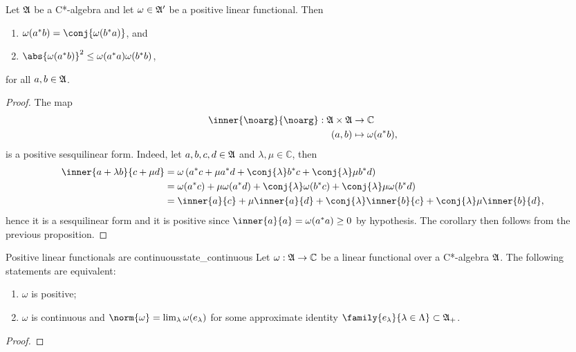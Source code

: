 \begin{corollary}
    Let \(\mathfrak{A}\) be a C*-algebra and let \(\omega \in \mathfrak{A}'\) be a positive linear functional. Then
    \begin{enumerate}[label=(\alph*)]
        \item \(\omega(a^*b) = \conj{\omega(b^*a)}\), and
        \item \(\abs{\omega(a^*b)}^2 \leq \omega(a^*a) \omega(b^*b)\),
    \end{enumerate}
    for all \(a, b \in \mathfrak{A}\).
\end{corollary}
\begin{proof}
    The map
    \begin{align*}
        \inner{\noarg}{\noarg} : \algebra{A} \times \algebra{A} &\to \mathbb{C}\\
                                                          (a,b) &\mapsto \omega(a^*b),
    \end{align*}
    is a positive sesquilinear form. Indeed, let \(a, b,c,d \in \mathfrak{A}\) and \(\lambda,\mu \in \mathbb{C}\), then
    \begin{align*}
        \inner{a + \lambda b}{c + \mu d} &= \omega\left(a^*c + \mu a^*d + \conj{\lambda} b^* c + \conj{\lambda}\mu b^*d\right)\\
                                         &= \omega(a^*c) + \mu \omega(a^*d) + \conj{\lambda} \omega(b^*c) + \conj{\lambda}\mu \omega(b^*d)\\
                                         &= \inner{a}{c} + \mu \inner{a}{d} + \conj{\lambda} \inner{b}{c} + \conj{\lambda}\mu \inner{b}{d},
    \end{align*}
    hence it is a sesquilinear form and it is positive since \(\inner{a}{a} = \omega(a^*a) \geq 0\) by hypothesis. The corollary then follows from the previous proposition.
\end{proof}

\begin{proposition}{Positive linear functionals are continuous}{state_continuous}
    Let \(\omega : \mathfrak{A} \to \mathbb{C}\) be a linear functional over a C*-algebra \(\mathfrak{A}\). The following statements are equivalent:
    \begin{enumerate}[label=(\alph*)]
        \item \(\omega\) is positive;
        \item \(\omega\) is continuous and \(\norm{\omega} = \lim_{\lambda} \omega(e_{\lambda})\) for some approximate identity \(\family{e_{\lambda}}{\lambda \in \Lambda} \subset \algebra{A}_+\).
    \end{enumerate}
\end{proposition}
\begin{proof}
\end{proof}
